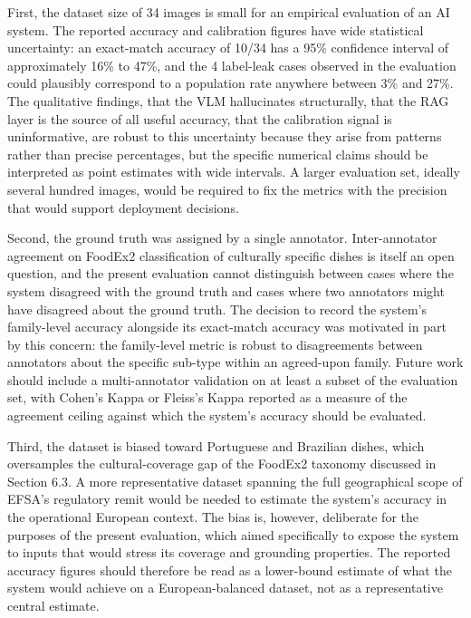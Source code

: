 First, the dataset size of 34 images is small for an empirical evaluation of an AI system. The reported accuracy and calibration figures have wide statistical uncertainty: an exact-match accuracy of 10/34 has a 95\% confidence interval of approximately 16\% to 47\%, and the 4 label-leak cases observed in the evaluation could plausibly correspond to a population rate anywhere between 3\% and 27\%. The qualitative findings, that the VLM hallucinates structurally, that the RAG layer is the source of all useful accuracy, that the calibration signal is uninformative, are robust to this uncertainty because they arise from patterns rather than precise percentages, but the specific numerical claims should be interpreted as point estimates with wide intervals. A larger evaluation set, ideally several hundred images, would be required to fix the metrics with the precision that would support deployment decisions.

Second, the ground truth was assigned by a single annotator. Inter-annotator agreement on FoodEx2 classification of culturally specific dishes is itself an open question, and the present evaluation cannot distinguish between cases where the system disagreed with the ground truth and cases where two annotators might have disagreed about the ground truth. The decision to record the system's family-level accuracy alongside its exact-match accuracy was motivated in part by this concern: the family-level metric is robust to disagreements between annotators about the specific sub-type within an agreed-upon family. Future work should include a multi-annotator validation on at least a subset of the evaluation set, with Cohen's Kappa or Fleiss's Kappa reported as a measure of the agreement ceiling against which the system's accuracy should be evaluated.

Third, the dataset is biased toward Portuguese and Brazilian dishes, which oversamples the cultural-coverage gap of the FoodEx2 taxonomy discussed in Section 6.3. A more representative dataset spanning the full geographical scope of EFSA's regulatory remit would be needed to estimate the system's accuracy in the operational European context. The bias is, however, deliberate for the purposes of the present evaluation, which aimed specifically to expose the system to inputs that would stress its coverage and grounding properties. The reported accuracy figures should therefore be read as a lower-bound estimate of what the system would achieve on a European-balanced dataset, not as a representative central estimate.

